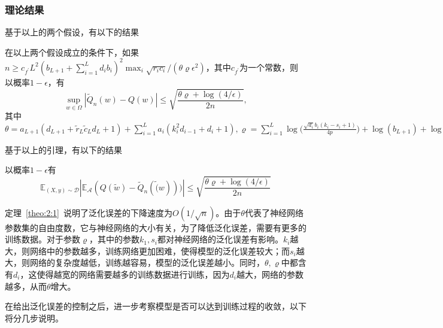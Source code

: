 \subsubsection{理论结果}
\par
基于以上的两个假设，有以下的结果
\begin{lemma}
在以上两个假设成立的条件下，如果$n\geq c_{f^\prime}L^2(b_{L+1}+\sum_{i=1}^L d_i b_i)^2 \max_i \sqrt{r_ic_i}/(\theta \varrho \epsilon^2)$，其中$c_{f^\prime}$为一个常数，则以概率$1-\epsilon$，有
\begin{equation}
\sup_{w\in \Omega} |\tilde{Q}_n(w)-Q(w)|\leq \sqrt{\frac{\theta \varrho +\log(4/\epsilon)}{2n}},
\end{equation}
其中$\theta = a_{L+1}(d_{L+1}+\tilde{r}_L\tilde{c}_Ld_L+1)+\sum_{i=1}^L a_i(k_i^2d_{i-1}+d_i+1),  \varrho = \sum_{i=1}^L \log\big(\frac{\sqrt{d_i}b_i(k_i-s_i+1)}{4p}\big)+\log(b_{L+1}) + \log{\frac{n}{128p^2}}$
\end{lemma}
\par
基于以上的引理，有以下的结果
\begin{theorem}\label{theo:2:1}
以概率$1-\epsilon$有
\[
\mathbb{E}_{(X,y)\sim \mathcal{D}}|\mathbb{E}_{\mathcal{A}}(Q(\tilde{w}) - \tilde{Q}_n(\tilde(w)))| \leq \sqrt{\frac{\theta \varrho + \log(4/\epsilon)}{2n}}
\]
\end{theorem}

\par
定理~\ref{theo:2:1}~说明了泛化误差的下降速度为$O(1/\sqrt{n})$。由于$\theta$代表了神经网络参数集的自由度数，它与神经网络的大小有关，为了降低泛化误差，需要有更多的训练数据。对于参数$\varrho$，其中的参数$k_1,s_i$都对神经网络的泛化误差有影响。$k_i$越大，则网络中的参数越多，训练网络更加困难，使得模型的泛化误差较大；而$s_i$越大，则网络的复杂度越低，训练越容易，模型的泛化误差越小。同时，$\theta, \varrho$中都含有$d_i$，这使得越宽的网络需要越多的训练数据进行训练，因为$d_i$越大，网络的参数越多，从而$\theta$增大。

\par
在给出泛化误差的控制之后，进一步考察模型是否可以达到训练过程的收敛，以下将分几步说明。


